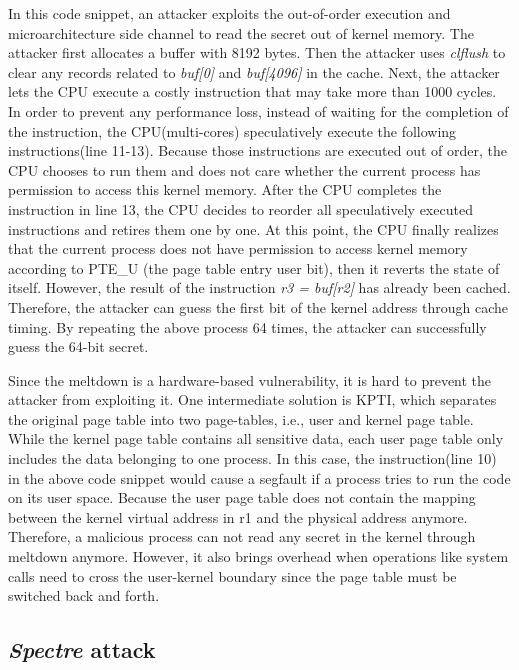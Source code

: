 In this code snippet, an attacker exploits the out-of-order execution and 
microarchitecture side channel to read the secret out of kernel memory. 
The attacker first allocates a buffer with 8192 bytes. Then the attacker uses 
\emph{clflush} to clear any records related to \emph{buf[0]} and \emph{buf[4096]} in the cache. 
Next, the attacker lets the CPU execute a costly instruction that may take more than 1000 cycles. 
In order to prevent any performance loss, instead of waiting for the completion of the instruction,  
the CPU(multi-cores) speculatively execute the following instructions(line 11-13). 
Because those instructions are executed out of order, the CPU chooses to run them and does 
not care whether the current process has permission to access this kernel memory. 
After the CPU completes the instruction in line 13, the CPU decides to reorder all speculatively 
executed instructions and retires them one by one. At this point, the CPU finally 
realizes that the current process does not have permission to access kernel memory 
according to PTE\_U (the page table entry user bit), then it reverts the state of itself. 
However, the result of the instruction \emph{r3 = buf[r2]} has already been cached. Therefore, 
the attacker can guess the first bit of the kernel address through cache timing\cite{11}. 
By repeating the above process 64 times, the attacker can successfully guess the 64-bit secret.

Since the meltdown is a hardware-based vulnerability, it is hard to prevent the attacker 
from exploiting it. One intermediate solution is KPTI\cite{2}, which separates the original page 
table into two page-tables, i.e., user and kernel page table.  While the kernel page table 
contains all sensitive data, each user page table only includes the data belonging to one process. 
In this case, the instruction(line 10) in the above code snippet would cause a segfault if 
a process tries to run the code on its user space. Because the user page table does not contain 
the mapping between the kernel virtual address in r1 and the physical address anymore. Therefore, 
a malicious process can not read any secret in the kernel through meltdown anymore. However, 
it also brings overhead when operations like system calls need to cross the user-kernel boundary 
since the page table must be switched back and forth.

\subsection{\emph{Spectre} attack}

